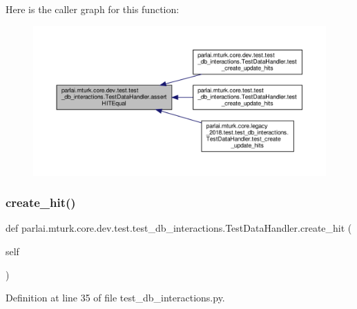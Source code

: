 Here is the caller graph for this function\+:
\nopagebreak
\begin{figure}[H]
\begin{center}
\leavevmode
\includegraphics[width=350pt]{classparlai_1_1mturk_1_1core_1_1dev_1_1test_1_1test__db__interactions_1_1TestDataHandler_afcc6cc8e2f9e340c656500ca88aaceec_icgraph}
\end{center}
\end{figure}
\mbox{\label{classparlai_1_1mturk_1_1core_1_1dev_1_1test_1_1test__db__interactions_1_1TestDataHandler_a9b8412813e505af83e8fa3b27baa6c6e}} 
\subsubsection{\texorpdfstring{create\+\_\+hit()}{create\_hit()}}
{\footnotesize\ttfamily def parlai.\+mturk.\+core.\+dev.\+test.\+test\+\_\+db\+\_\+interactions.\+Test\+Data\+Handler.\+create\+\_\+hit (\begin{DoxyParamCaption}\item[{}]{self }\end{DoxyParamCaption})}



Definition at line 35 of file test\+\_\+db\+\_\+interactions.\+py.



